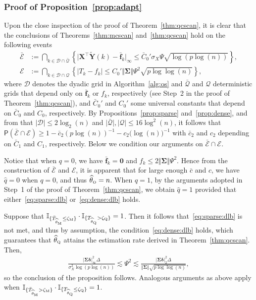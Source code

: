 \documentclass[11pt, a4paper]{article}
\newcommand{\mbf}{\mathbf}
\newcommand{\mc}{\mathcal}
\renewcommand{\l}{\left}
\renewcommand{\r}{\right}
\def\wh{\widehat}
\def\wt{\widetilde}
\newcommand{\cp}{\theta}
\newcommand{\p}{\mathsf{P}}
\newcommand{\Mc}{\text{\tiny \upshape M}} %
\newcommand{\Qc}{\text{\tiny \upshape Q}} %
\newcommand{\Oc}{\text{\tiny \upshape O}} %
\theoremstyle{definition}
\theoremstyle{definition}
\theoremstyle{definition}
\theoremstyle{definition}
\theoremstyle{definition}
\theoremstyle{remark}
\theoremstyle{definition}
\theoremstyle{definition}
\theoremstyle{definition}
\begin{document}
\subsubsection{Proof of Proposition~\ref{prop:adapt}}

Upon the close inspection of the proof of Theorem~\ref{thm:qcscan}, it is clear that the conclusions of Theorems~\ref{thm:mcscan} and~\ref{thm:qcscan} hold on the following events
\begin{subequations}
\begin{align}
\bar{\mc E} &:= \bigcap_{k \in \mc D \cap \bar{\mc Q}} \l\{ \vert \mbf X^\top \wt{\mbf Y}(k) - \bar{\mbf f}_k \vert_\infty \le \bar{C}_0' \sigma_X \Psi \sqrt{\log(p\log(n))}  \r\}, \\
\mc E &:= \bigcap_{k \in \mc D \cap \mc Q} \l\{ \vert T_k - f_k \vert \le C_0' \Vert \bm\Sigma \Vert \Psi^2 \sqrt{p\log\log(n)}  \r\},
\end{align}
\label{eq:set:e} 
\end{subequations}
where $\mc D$ denotes the dyadic grid in Algorithm~\ref{alg:os} and $\bar{\mc Q}$ and $\mc Q$ deterministic grids that depend only on $\bar{\mbf f}_k$ or $f_k$, respectively (see Step~2 in the proof of Theorem~\ref{thm:qcscan}), and $\bar{C}_0'$ and $C_0'$ some universal constants that depend on $\bar{C}_0$ and $C_0$, respectively.
By Propositions~\ref{prop:sparse} and~\ref{prop:dense}, and from that $\vert \mc D \vert \le 2\log_2(n)$ and $\vert \bar{\mc Q} \vert, \vert \mc Q \vert \le 16\log^2(n)$, it follows that $\p(\bar{\mc E} \cap \mc E) \ge 1 - \bar{c}_2 (p\log(n))^{-1} - c_2 \bigl(\log(n)\bigr)^{-1}$ with $\bar{c}_2$ and $c_2$ depending on $\bar{C}_1$ and $C_1$, respectively.
Below we condition our arguments on $\bar{\mc E} \cap \mc E$. 

Notice that when $q = 0$, we have $\bar{\mbf f}_k = \mbf 0$ and $f_k \le 2 \Vert \bm\Sigma \Vert \Psi^2$. 
Hence from the construction of $\bar{\mc E}$ and $\mc E$, it is apparent that for large enough $\bar{c}$ and $c$, we have $\wh q = 0$ when $q = 0$, and thus $\wh\cp_{\Oc} = n$.
When $q = 1$, by the arguments adopted in Step~1 of the proof of Theorem~\ref{thm:qcscan}, we obtain $\wh q = 1$ provided that either~\eqref{eq:sparse:dlb} or~\eqref{eq:dense:dlb} holds.

Suppose that $\mathbb{I}_{\{\bar{T}_{\wh\cp_{\Mc}} \le \zeta_{\Mc} \}} \cdot \mathbb{I}_{\{T_{\wh\cp_{\Qc}} > \zeta_{\Qc} \}} = 1$.
Then it follows that~\eqref{eq:sparse:dlb} is not met, and thus by assumption, the condition~\eqref{eq:dense:dlb} holds, which guarantees that $\wh\cp_{\Qc}$ attains the estimation rate derived in Theorem~\ref{thm:qcscan}.
Then,
\begin{align*}
\frac{\vert \bm\Sigma \bm\delta \vert_\infty^2 \Delta}{\sigma_X^2 \log(p\log(n))} \lesssim \Psi^2 \lesssim \frac{\vert \bm\Sigma \bm\delta \vert_2^2 \Delta}{{ \Vert \bm\Sigma \Vert} \sqrt{p\log\log(n)}},
\end{align*}
so the conclusion of the proposition follows. 
Analogous arguments as above apply when $\mathbb{I}_{\{\bar{T}_{\wh\cp_{\Mc}} > \zeta_{\Mc} \}} \cdot \mathbb{I}_{\{T_{\wh\cp_{\Qc}} \le \zeta_{\Qc} \}} = 1$.
\end{document}
